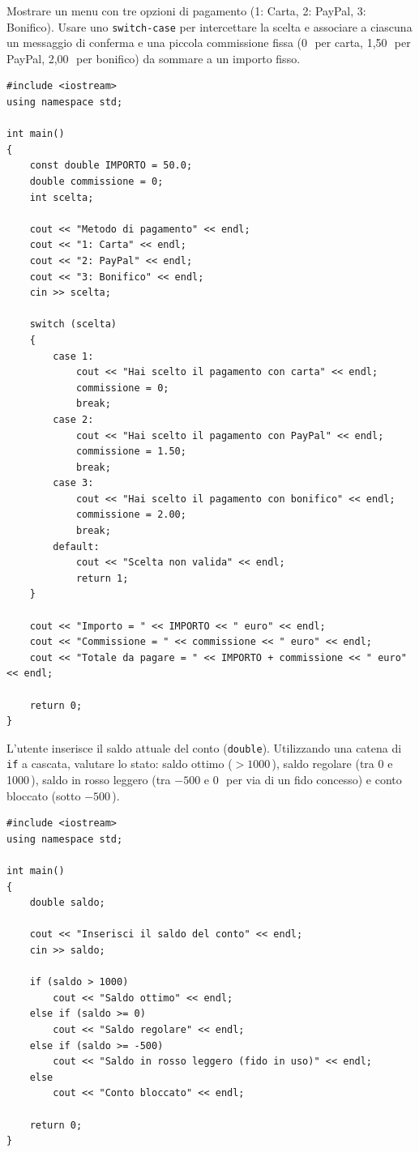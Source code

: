 \documentclass[11pt,fleqn]{book}
\begin{document}
\begin{esercizio}[2]
    Mostrare un menu con tre opzioni di pagamento (1: Carta, 2: PayPal, 3: Bonifico). Usare uno \texttt{switch-case} per intercettare la scelta e associare a ciascuna un messaggio di conferma e una piccola commissione fissa (0\,\texteuro\ per carta, 1,50\,\texteuro\ per PayPal, 2,00\,\texteuro\ per bonifico) da sommare a un importo fisso.
    \ifsoluzioni
    \solution
    \begin{lstlisting}[style=cpp]
#include <iostream>
using namespace std;

int main()
{
    const double IMPORTO = 50.0;
    double commissione = 0;
    int scelta;

    cout << "Metodo di pagamento" << endl;
    cout << "1: Carta" << endl;
    cout << "2: PayPal" << endl;
    cout << "3: Bonifico" << endl;
    cin >> scelta;

    switch (scelta)
    {
        case 1:
            cout << "Hai scelto il pagamento con carta" << endl;
            commissione = 0;
            break;
        case 2:
            cout << "Hai scelto il pagamento con PayPal" << endl;
            commissione = 1.50;
            break;
        case 3:
            cout << "Hai scelto il pagamento con bonifico" << endl;
            commissione = 2.00;
            break;
        default:
            cout << "Scelta non valida" << endl;
            return 1;
    }

    cout << "Importo = " << IMPORTO << " euro" << endl;
    cout << "Commissione = " << commissione << " euro" << endl;
    cout << "Totale da pagare = " << IMPORTO + commissione << " euro" << endl;

    return 0;
}
    \end{lstlisting}
    \fi
\end{esercizio}

\begin{esercizio}[1]
    L'utente inserisce il saldo attuale del conto (\texttt{double}). Utilizzando una catena di \texttt{if} a cascata, valutare lo stato: saldo ottimo ($> 1000$\,\texteuro), saldo regolare (tra 0 e 1000\,\texteuro), saldo in rosso leggero (tra $-500$ e 0\,\texteuro\ per via di un fido concesso) e conto bloccato (sotto $-500$\,\texteuro).
    \ifsoluzioni
    \solution
    \begin{lstlisting}[style=cpp]
#include <iostream>
using namespace std;

int main()
{
    double saldo;

    cout << "Inserisci il saldo del conto" << endl;
    cin >> saldo;

    if (saldo > 1000)
        cout << "Saldo ottimo" << endl;
    else if (saldo >= 0)
        cout << "Saldo regolare" << endl;
    else if (saldo >= -500)
        cout << "Saldo in rosso leggero (fido in uso)" << endl;
    else
        cout << "Conto bloccato" << endl;

    return 0;
}
    \end{lstlisting}
    \fi
\end{esercizio}
\end{document}
